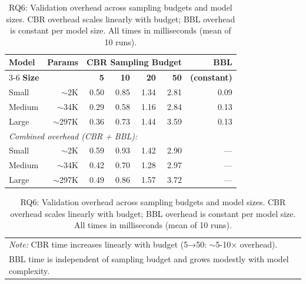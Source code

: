 \begin{table}[t]
\centering
\caption{RQ6: Validation overhead across sampling budgets and model sizes. CBR overhead scales linearly with budget; BBL overhead is constant per model size. All times in milliseconds (mean of 10 runs).}
\label{tab:rq6-overhead-full}
\small
\setlength{\tabcolsep}{5pt}
\begin{tabular}{l@{\hspace{8pt}}r@{\hspace{12pt}}rrrr@{\hspace{12pt}}r}
\toprule
\textbf{Model} & \textbf{Params} & \multicolumn{4}{c}{\textbf{CBR Sampling Budget}} & \textbf{BBL} \\
\cmidrule(lr){3-6}
\textbf{Size} & & \textbf{5} & \textbf{10} & \textbf{20} & \textbf{50} & \textbf{(constant)} \\
\midrule
Small   & $\sim$2K   & 0.50 & 0.85 & 1.34 & 2.81 & 0.09 \\
Medium  & $\sim$34K  & 0.29 & 0.58 & 1.16 & 2.84 & 0.13 \\
Large   & $\sim$297K & 0.36 & 0.73 & 1.44 & 3.59 & 0.13 \\
\midrule
\multicolumn{7}{l}{\textit{Combined overhead (CBR + BBL):}} \\
Small   & $\sim$2K   & 0.59 & 0.93 & 1.42 & 2.90 & --- \\
Medium  & $\sim$34K  & 0.42 & 0.70 & 1.28 & 2.97 & --- \\
Large   & $\sim$297K & 0.49 & 0.86 & 1.57 & 3.72 & --- \\
\bottomrule
\end{tabular}
\vspace{2mm}
\begin{tabular}{@{}l@{}}
\footnotesize
\textit{Note:} CBR time increases linearly with budget (5→50: $\sim$5-10× overhead). \\
\footnotesize
BBL time is independent of sampling budget and grows modestly with model complexity.
\end{tabular}
\end{table}
